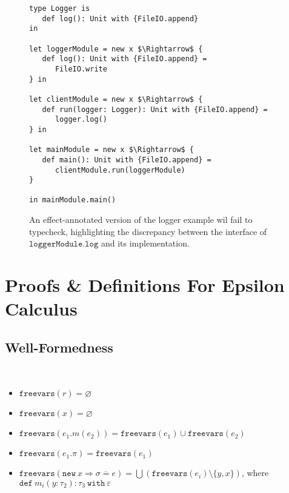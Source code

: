\documentclass[a4paper,UKenglish]{lipics-v2016}
\newcommand{\kw}[1]{\mathtt{ #1 }~}
\newcommand{\kwa}[1]{\mathtt{ #1 }}
\newcommand{\newbasic}[0]{
	\kwa{new}~x \Rightarrow \overline{\sigma = e}
}
\begin{document}
\begin{figure}[h]
\vspace{-5pt}
\begin{lstlisting}[mathescape]
type Logger is
   def log(): Unit with {FileIO.append}
in

let loggerModule = new x $\Rightarrow$ {
   def log(): Unit with {FileIO.append} =
      FileIO.write
} in
      
let clientModule = new x $\Rightarrow$ {
   def run(logger: Logger): Unit with {FileIO.append} =
      logger.log()
} in

let mainModule = new x $\Rightarrow$ {
   def main(): Unit with {FileIO.append} =
      clientModule.run(loggerModule)
}

in mainModule.main()

\end{lstlisting}

\vspace{-7pt}
\caption{An effect-annotated version of the logger example wil fail to typecheck, highlighting the discrepancy between the interface of $\kwa{loggerModule.log}$ and its implementation.}
\end{figure}

\newpage

\appendix
\section{Proofs \& Definitions For Epsilon Calculus}

\subsection{Well-Formedness}

\begin{definition}[$\kwa{freevars}$]~
\begin{itemize}
	\item $\kwa{freevars}(r) = \varnothing$
	\item $\kwa{freevars}(x) = \varnothing$
	\item $\kwa{freevars}(e_1.m(e_2)) = \kwa{freevars}(e_1) \cup \kwa{freevars}(e_2)$
	\item $\kwa{freevars}(e_1.\pi) = \kwa{freevars}(e_1)$
	\item $\kwa{freevars}(\newbasic) = \bigcup (\kwa{freevars}(e_i) \setminus \{ y, x \})$, where $\kw{def} m_i(y: \tau_2): \tau_3~\kw{with} \varepsilon$
\end{itemize}
\end{definition}
\end{document}
